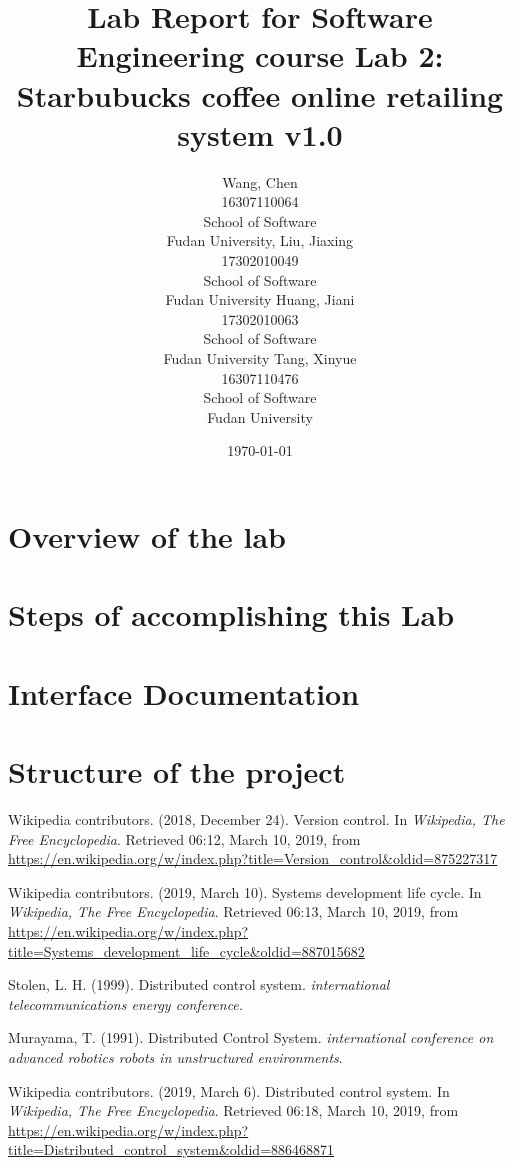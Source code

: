 \documentclass[a4paper]{report}
\title{Lab Report for Software Engineering course \newline
 Lab 2: Starbubucks coffee online retailing system v1.0}
\author{Wang, Chen \\ 16307110064 \\ School of Software\\ Fudan University,
Liu, Jiaxing\\17302010049 \\ School of Software\\ Fudan University
Huang, Jiani\\17302010063\\School of Software\\ Fudan University
Tang, Xinyue\\16307110476\\School of Software\\ Fudan University}
\date{\today}
\begin{document}
\maketitle

\tableofcontents

\chapter{Overview of the lab}



\chapter{Steps of accomplishing this Lab}



\chapter{Interface Documentation}


\chapter{Structure of  the project}



\begin{thebibliography}{A}

Wikipedia contributors. (2018, December 24). Version control. In \emph{Wikipedia, The Free Encyclopedia}. Retrieved 06:12, March 10, 2019, from \url{https://en.wikipedia.org/w/index.php?title=Version_control&oldid=875227317}

Wikipedia contributors. (2019, March 10). Systems development life cycle. In \emph{Wikipedia, The Free Encyclopedia}. Retrieved 06:13, March 10, 2019, from \url{https://en.wikipedia.org/w/index.php?title=Systems_development_life_cycle&oldid=887015682}

Stolen, L. H. (1999). Distributed control system. \emph{international telecommunications energy conference.}

Murayama, T. (1991). Distributed Control System. \emph{international conference on advanced robotics robots in unstructured environments}.

Wikipedia contributors. (2019, March 6). Distributed control system. In \emph{Wikipedia, The Free Encyclopedia}. Retrieved 06:18, March 10, 2019, from \url{https://en.wikipedia.org/w/index.php?title=Distributed_control_system&oldid=886468871}

\end{thebibliography}
\end{document}
